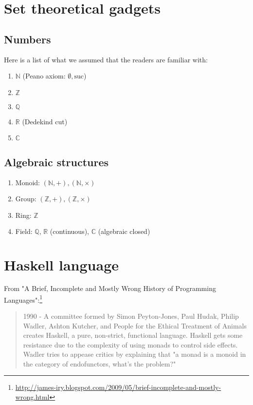 \documentclass[11pt]{book}
\begin{document}
\section{Set theoretical gadgets}
\subsection{Numbers}
Here is a list of what we assumed that the readers are familiar with:
\begin{enumerate}
\item $\mathbb{N}$ (Peano axiom: $\emptyset, \text{suc}$)
\item $\mathbb{Z}$
\item $\mathbb{Q}$
\item $\mathbb{R}$ (Dedekind cut)
\item $\mathbb{C}$ 
\end{enumerate}

\subsection{Algebraic structures}
\begin{enumerate}
\item Monoid: $(\mathbb{N},+), (\mathbb{N},\times)$
\item Group: $(\mathbb{Z},+), (\mathbb{Z},\times)$
\item Ring: $\mathbb{Z}$
\item Field: $\mathbb{Q}$, $\mathbb{R}$ (continuous), $\mathbb{C}$ (algebraic closed)
\end{enumerate}

\section{Haskell language}
From "A Brief, Incomplete and Mostly Wrong History of Programming Languages":\footnote{
\url{http://james-iry.blogspot.com/2009/05/brief-incomplete-and-mostly-wrong.html}
}
\begin{quotation}
1990 - A committee formed by Simon Peyton-Jones, Paul Hudak, Philip Wadler, Ashton Kutcher, and People for the Ethical Treatment of Animals creates Haskell, a pure, non-strict, functional language. Haskell gets some resistance due to the complexity of using monads to control side effects. Wadler tries to appease critics by explaining that "a monad is a monoid in the category of endofunctors, what's the problem?" 
\end{quotation}
\end{document}
